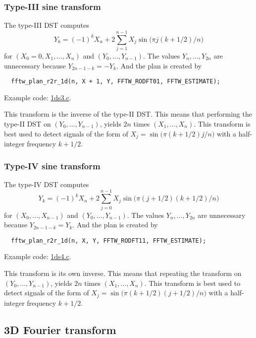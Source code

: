 \documentclass[12pt]{article}
\begin{document}
\subsubsection{Type-III sine transform}
The type-III DST computes
\begin{equation}
  Y_k = (-1)^k X_n
    + 2 \sum_{j = 1}^{n - 1} X_j \sin\big( \pi j (k + 1/2) / n \big)
\end{equation}
%
for $(X_0 = 0, X_1, \dots, X_{n})$ and $(Y_0, \dots, Y_{n-1})$.
%
The values $Y_{n}, \dots, Y_{2n}$ are unnecessary because
$Y_{2n - 1 - k} = -Y_k$.
%
And the plan is created by
\begin{verbatim}
  fftw_plan_r2r_1d(n, X + 1, Y, FFTW_RODFT01, FFTW_ESTIMATE);
\end{verbatim}
Example code: \url{1ds3.c}.


This transform is the inverse of the type-II DST.
%
This means that performing the type-II DST on $(Y_0, \dots, Y_{n-1})$,
  yields $2n$ times $(X_1, \dots, X_{n})$.
This transform is best used to detect signals of the form of
  $X_j = \sin\big(\pi (k + 1/2) j / n \big)$
  with a half-integer frequency $k + 1/2$.





\subsubsection{Type-IV sine transform}
The type-IV DST computes
\begin{equation}
  Y_k = (-1)^k X_n
    + 2 \sum_{j = 0}^{n - 1} X_j \sin\big( \pi (j + 1/2) (k + 1/2) / n \big)
\end{equation}
%
for $(X_0, \dots, X_{n - 1})$ and $(Y_0, \dots, Y_{n-1})$.
%
The values $Y_{n}, \dots, Y_{2n}$ are unnecessary because
$Y_{2n - 1 - k} = Y_k$.
%
And the plan is created by
\begin{verbatim}
  fftw_plan_r2r_1d(n, X, Y, FFTW_RODFT11, FFTW_ESTIMATE);
\end{verbatim}
Example code: \url{1ds4.c}.


This transform is its own inverse.
%
This means that repeating the transform on $(Y_0, \dots, Y_{n-1})$,
  yields $2n$ times $(X_1, \dots, X_{n})$.
This transform is best used to detect signals of the form of
  $X_j = \sin\big(\pi (k + 1/2) (j + 1/2) / n \big)$
  with a half-integer frequency $k + 1/2$.





\subsection{3D Fourier transform}
\end{document}
